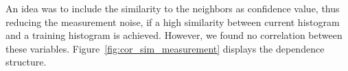 An idea was to include the similarity to the neighbors as confidence
value, thus reducing the measurement noise, if a high similarity
between current histogram and a training histogram is
achieved. However, we found no correlation between these
variables. Figure~\ref{fig:cor_sim_measurement} displays the
dependence structure.